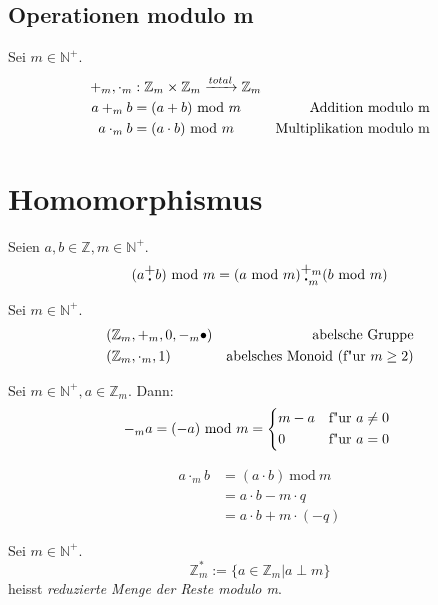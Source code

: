 \documentclass[a4paper, ngerman, landscape, fleqn]{article}
\newcommand{\Mod}{\ \mathrm{mod}\ }
\newcommand{\plusdot}{\stackanchor[1pt]{$+$}{$\boldsymbol{\cdot}$}}
\newcommand{\plusdotm}{\stackanchor[1pt]{$+_m$}{$\boldsymbol{\cdot}_m$}}
\begin{document}
\begin{multicols*}{3}
\subsection*{Operationen modulo m}
Sei $m \in \mathbb{N}^+$.
\begin{alignat*}{2}
    +_m, \cdot_m &: \mathbb{Z}_m \times \mathbb{Z}_m \xrightarrow{total} \mathbb{Z}_m & \\
    a +_m b &= (a + b) \Mod m \hfill &\text{Addition modulo m} \\
    a \cdot_m b &= (a \cdot b) \Mod m \hfill &\text{Multiplikation modulo m} 
\end{alignat*}


\section*{Homomorphismus}
Seien $a, b \in \mathbb{Z}, m \in \mathbb{N}^+$.
\begin{equation*}
    (a \plusdot b) \Mod m = (a \Mod m) \plusdotm (b \Mod m)
\end{equation*}

Sei $m \in \mathbb{N}^+$.
\begin{alignat*}{2}
    &(\mathbb{Z}_m, +_m, 0, -_m\bullet) & \hfill \text{abelsche Gruppe} \\
    &(\mathbb{Z}_m, \cdot_m, 1) & \hfill \text{abelsches Monoid (f"ur $m \geq 2$)} \\
\end{alignat*}

Sei $m \in \mathbb{N}^+, a \in \mathbb{Z}_m$. Dann:
\begin{equation*}
    -_m a = (-a) \Mod m = 
    \begin{cases*}
        m - a & f"ur $a \neq 0$ \\
        0     & f"ur $a = 0$
    \end{cases*}
\end{equation*}

\begin{align*}
    a \cdot_m b &= (a \cdot b) \Mod m \\
                &= a \cdot b - m \cdot q \\
                &= a \cdot b + m \cdot (-q)
\end{align*}


Sei $m \in \mathbb{N}^+$.
\begin{equation*}
    \mathbb{Z}^*_m := \{ a \in \mathbb{Z}_m | a \perp m \}
\end{equation*}
heisst \emph{reduzierte Menge der Reste modulo m}.


\end{multicols*}
\end{document}
